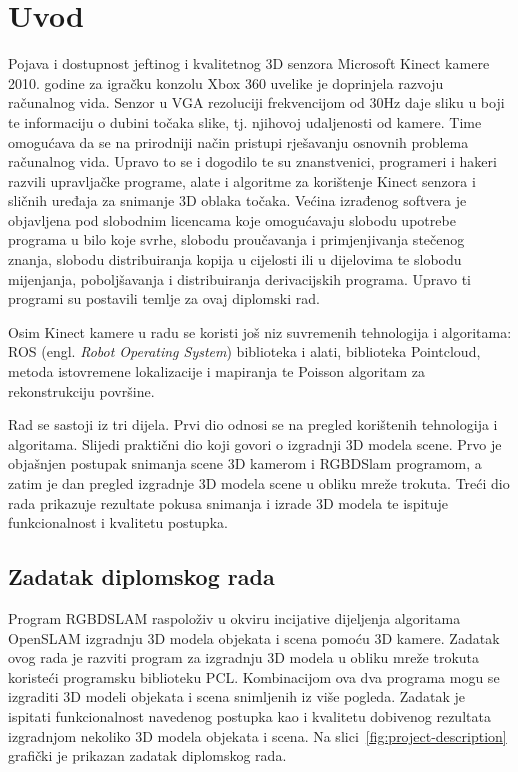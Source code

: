 \newpage

\setcounter{page}{1}
\setcounter{figure}{0}
\section{Uvod}%
\label{sec:Uvod}

Pojava i dostupnost jeftinog i kvalitetnog 3D senzora Microsoft Kinect
kamere 2010. godine za igračku konzolu Xbox 360 uvelike je doprinjela
razvoju računalnog vida. Senzor u VGA rezoluciji frekvencijom od 30Hz
daje sliku u boji te informaciju o dubini točaka slike, tj. njihovoj
udaljenosti od kamere. Time omogućava da se na prirodniji način pristupi
rješavanju osnovnih problema računalnog vida.  Upravo to se i dogodilo
te su znanstvenici, programeri i hakeri razvili upravljačke programe,
alate i algoritme za korištenje Kinect senzora i sličnih uređaja za
snimanje 3D oblaka točaka. Većina izrađenog softvera je objavljena pod
slobodnim licencama koje omogućavaju slobodu upotrebe programa u bilo
koje svrhe, slobodu proučavanja i primjenjivanja stečenog znanja,
slobodu distribuiranja kopija u cijelosti ili u dijelovima te slobodu
mijenjanja, poboljšavanja i distribuiranja derivacijskih programa.
Upravo ti programi su postavili temlje za ovaj diplomski rad.

Osim Kinect kamere u radu se koristi još niz suvremenih tehnologija i
algoritama: ROS (engl. \textit{Robot Operating System}) biblioteka i
alati, biblioteka Pointcloud, metoda istovremene lokalizacije i
mapiranja te Poisson algoritam za rekonstrukciju površine.

Rad se sastoji iz tri dijela. Prvi dio odnosi se na pregled korištenih
tehnologija i algoritama. Slijedi praktični dio koji govori o
izgradnji 3D modela scene. Prvo je objašnjen postupak snimanja scene 3D
kamerom i RGBDSlam programom, a zatim je dan pregled izgradnje 3D modela
scene u obliku mreže trokuta. Treći dio rada prikazuje rezultate pokusa
snimanja i izrade 3D modela te ispituje funkcionalnost i kvalitetu
postupka.

\newpage
\subsection{Zadatak diplomskog rada} %
\label{sub:Zadatak diplomskog rada}

Program RGBDSLAM raspoloživ u okviru incijative dijeljenja algoritama
OpenSLAM  izgradnju 3D modela objekata i scena
pomoću 3D kamere. Zadatak ovog rada je razviti program za izgradnju 3D
modela u obliku mreže trokuta koristeći programsku biblioteku PCL.
Kombinacijom ova dva programa mogu se izgraditi 3D modeli objekata i
scena snimljenih iz više pogleda. Zadatak je ispitati funkcionalnost
navedenog postupka kao i kvalitetu dobivenog rezultata izgradnjom
nekoliko 3D modela objekata i scena. Na
slici~\ref{fig:project-description} grafički je prikazan zadatak
diplomskog rada.

